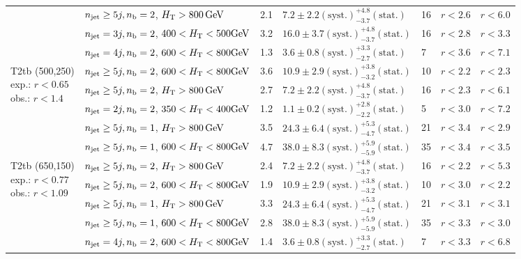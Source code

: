 \begin{table}[h!]
\begin{tabular}{ lllllll }
 & $n_{\mathrm{jet}} \geq5j,n_{\text{b}} =2$, $\mbox{$H_\text{T}$} > 800 \, \mathrm{GeV}$ & 2.1 & $7.2 \pm 2.2 \mathrm{(syst.)} ^{+4.8}_{-3.7} \mathrm{(stat.)}$ & 16 & $r < 2.6$ & $r < 6.0$\\ 
 & $n_{\mathrm{jet}} =3j,n_{\text{b}} =2$, $400 < \mbox{$H_\text{T}$} < 500 \mathrm{GeV}$ & 3.2 & $16.0 \pm 3.7 \mathrm{(syst.)} ^{+4.8}_{-3.7} \mathrm{(stat.)}$ & 16 & $r < 2.8$ & $r < 3.3$\\ 
 & $n_{\mathrm{jet}} =4j,n_{\text{b}} =2$, $600 < \mbox{$H_\text{T}$} < 800 \mathrm{GeV}$ & 1.3 & $3.6 \pm 0.8 \mathrm{(syst.)} ^{+3.3}_{-2.7} \mathrm{(stat.)}$ & 7 & $r < 3.6$ & $r < 7.1$\\ \hline
\multirow{5}{*}{\parbox[t]{2cm}{T2tb (500,250)\\exp.: $r<0.65$\\obs.: $r<1.4$}}
 & $n_{\mathrm{jet}} \geq5j,n_{\text{b}} =2$, $600 < \mbox{$H_\text{T}$} < 800 \mathrm{GeV}$ & 3.6 & $10.9 \pm 2.9 \mathrm{(syst.)} ^{+3.8}_{-3.2} \mathrm{(stat.)}$ & 10 & $r < 2.2$ & $r < 2.3$\\ 
 & $n_{\mathrm{jet}} \geq5j,n_{\text{b}} =2$, $\mbox{$H_\text{T}$} > 800 \, \mathrm{GeV}$ & 2.7 & $7.2 \pm 2.2 \mathrm{(syst.)} ^{+4.8}_{-3.7} \mathrm{(stat.)}$ & 16 & $r < 2.3$ & $r < 6.1$\\ 
 & $n_{\mathrm{jet}} =2j,n_{\text{b}} =2$, $350 < \mbox{$H_\text{T}$} < 400 \mathrm{GeV}$ & 1.2 & $1.1 \pm 0.2 \mathrm{(syst.)} ^{+2.8}_{-2.2} \mathrm{(stat.)}$ & 5 & $r < 3.0$ & $r < 7.2$\\ 
 & $n_{\mathrm{jet}} \geq5j,n_{\text{b}} =1$, $\mbox{$H_\text{T}$} > 800 \, \mathrm{GeV}$ & 3.5 & $24.3 \pm 6.4 \mathrm{(syst.)} ^{+5.3}_{-4.7} \mathrm{(stat.)}$ & 21 & $r < 3.4$ & $r < 2.9$\\ 
 & $n_{\mathrm{jet}} \geq5j,n_{\text{b}} =1$, $600 < \mbox{$H_\text{T}$} < 800 \mathrm{GeV}$ & 4.7 & $38.0 \pm 8.3 \mathrm{(syst.)} ^{+5.9}_{-5.9} \mathrm{(stat.)}$ & 35 & $r < 3.4$ & $r < 3.5$\\ \hline
\multirow{5}{*}{\parbox[t]{2cm}{T2tb (650,150)\\exp.: $r<0.77$\\obs.: $r<1.09$}}
 & $n_{\mathrm{jet}} \geq5j,n_{\text{b}} =2$, $\mbox{$H_\text{T}$} > 800 \, \mathrm{GeV}$ & 2.4 & $7.2 \pm 2.2 \mathrm{(syst.)} ^{+4.8}_{-3.7} \mathrm{(stat.)}$ & 16 & $r < 2.2$ & $r < 5.3$\\ 
 & $n_{\mathrm{jet}} \geq5j,n_{\text{b}} =2$, $600 < \mbox{$H_\text{T}$} < 800 \mathrm{GeV}$ & 1.9 & $10.9 \pm 2.9 \mathrm{(syst.)} ^{+3.8}_{-3.2} \mathrm{(stat.)}$ & 10 & $r < 3.0$ & $r < 2.2$\\ 
 & $n_{\mathrm{jet}} \geq5j,n_{\text{b}} =1$, $\mbox{$H_\text{T}$} > 800 \, \mathrm{GeV}$ & 3.3 & $24.3 \pm 6.4 \mathrm{(syst.)} ^{+5.3}_{-4.7} \mathrm{(stat.)}$ & 21 & $r < 3.1$ & $r < 3.1$\\ 
 & $n_{\mathrm{jet}} \geq5j,n_{\text{b}} =1$, $600 < \mbox{$H_\text{T}$} < 800 \mathrm{GeV}$ & 2.8 & $38.0 \pm 8.3 \mathrm{(syst.)} ^{+5.9}_{-5.9} \mathrm{(stat.)}$ & 35 & $r < 3.3$ & $r < 3.0$\\ 
 & $n_{\mathrm{jet}} =4j,n_{\text{b}} =2$, $600 < \mbox{$H_\text{T}$} < 800 \mathrm{GeV}$ & 1.4 & $3.6 \pm 0.8 \mathrm{(syst.)} ^{+3.3}_{-2.7} \mathrm{(stat.)}$ & 7 & $r < 3.3$ & $r < 6.8$\\ \hline    
    \hline
  \end{tabular}
\end{table}
